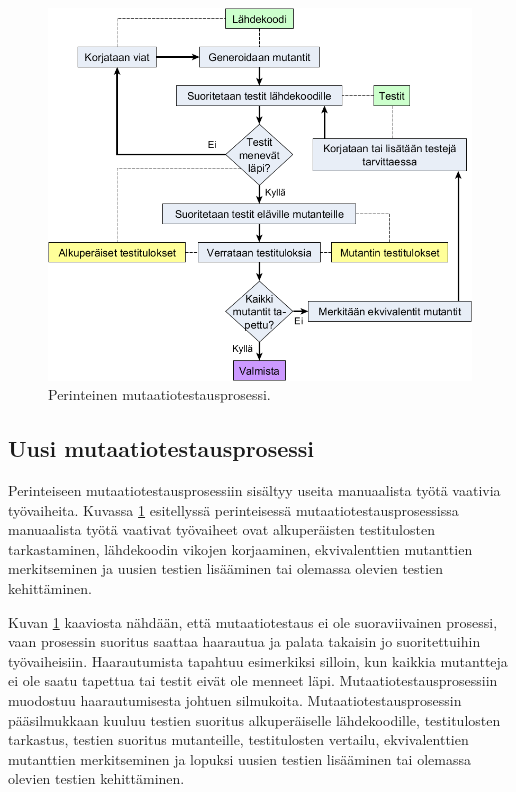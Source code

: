 \documentclass[finnish, grading]{tktltiki2}
\theoremstyle{definition}
\theoremstyle{remark}
\begin{document}
\begin{figure}[H]
	\centering
		\includegraphics[width=\textwidth]{mutaatiotestausprosessi3}
	\caption{Perinteinen mutaatiotestausprosessi.}
	\label{figure:Mutaatiotestausprosessi}
\end{figure}

\subsection{Uusi mutaatiotestausprosessi}

Perinteiseen mutaatiotestausprosessiin sisältyy useita manuaalista työtä vaativia työvaiheita. Kuvassa \ref{figure:Mutaatiotestausprosessi} esitellyssä perinteisessä mutaatiotestausprosessissa manuaalista työtä vaativat työvaiheet ovat alkuperäisten testitulosten tarkastaminen, lähdekoodin vikojen korjaaminen, ekvivalenttien mutanttien merkitseminen ja uusien testien lisääminen tai olemassa olevien testien kehittäminen. 

Kuvan \ref{figure:Mutaatiotestausprosessi} kaaviosta nähdään, että mutaatiotestaus ei ole suoraviivainen prosessi, vaan prosessin suoritus saattaa haarautua ja palata takaisin jo suoritettuihin työvaiheisiin. Haarautumista tapahtuu esimerkiksi silloin, kun kaikkia mutantteja ei ole saatu tapettua tai testit eivät ole menneet läpi. Mutaatiotestausprosessiin muodostuu haarautumisesta johtuen silmukoita. Mutaatiotestausprosessin pääsilmukkaan kuuluu testien suoritus alkuperäiselle lähdekoodille, testitulosten tarkastus, testien suoritus mutanteille, testitulosten vertailu, ekvivalenttien mutanttien merkitseminen ja lopuksi uusien testien lisääminen tai olemassa olevien testien kehittäminen.
\end{document}
